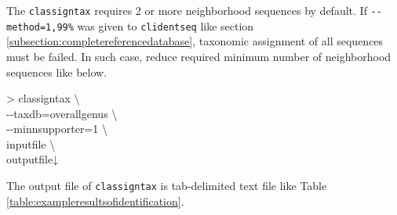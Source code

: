 \documentclass[titlepage,10pt,a4paper,english]{jsbook}
\newenvironment{cmd}{\begin{oframed}\raggedright\ttfamily\footnotesize\setlength{\baselineskip}{1.4em}}{\end{oframed}\vspace{-1em}}
\begin{document}
The \texttt{classigntax} requires 2 or more neighborhood sequences by default.
If \texttt{{-}{-}method=1,99\%} was given to \texttt{clidentseq} like section \ref{subsection:completereferencedatabase}, taxonomic assignment of all sequences must be failed.
In such case, reduce required minimum number of neighborhood sequences like below.
\begin{cmd}
{\textgreater} classigntax {\textbackslash}\\
{-}{-}taxdb=overall{\textunderscore}genus {\textbackslash}\\
{-}{-}minnsupporter=1 {\textbackslash}\\
inputfile {\textbackslash}\\
outputfile↓
\end{cmd}
The output file of \texttt{classigntax} is tab-delimited text file like Table \ref{table:exampleresultsofidentification}.
\end{document}
